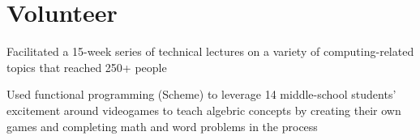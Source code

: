 \documentclass[letterpaper]{deedy-resume} %
\begin{document}
\begin{minipage}[t]{0.66\textwidth}
\sectionspace %

\section{Volunteer}


\begin{tightitemize}
\item Facilitated a 15-week series of technical lectures on a variety of computing-related topics that reached 250+ people
\end{tightitemize}

\sectionspace %



\begin{tightitemize}
\item Used functional programming (Scheme) to leverage 14 middle-school students' excitement around videogames to teach algebric concepts by creating their own games and completing math and word problems in the process
\end{tightitemize}

\sectionspace %


\end{minipage} %




\end{document}

